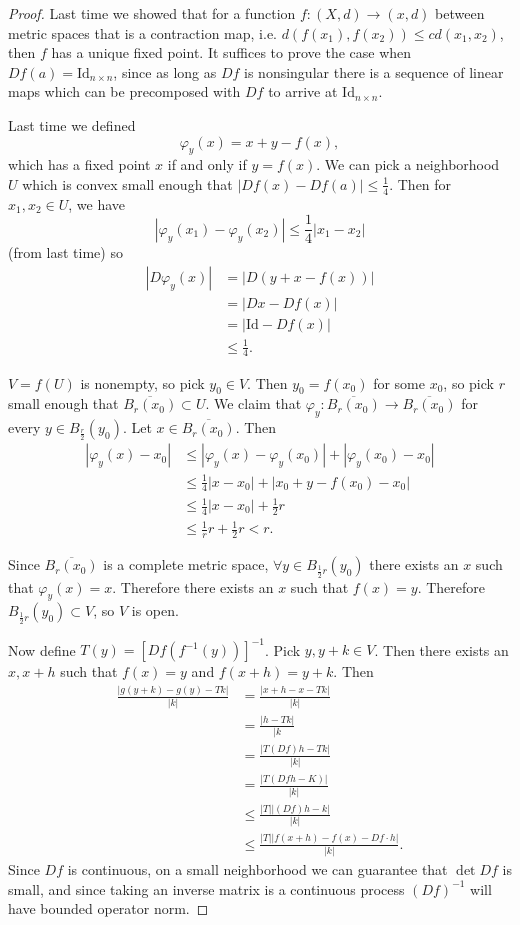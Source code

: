 \begin{proof}
Last time we showed that for a function
$f: (X, d) \to (x, d)$ between metric spaces that is a contraction
map, i.e. $d(f(x_1), f(x_2)) \leq c d(x_1, x_2)$, then $f$ has a unique
fixed point. It suffices to prove the case when
$Df(a) = \mathrm{Id}_{n  \times n}$, since as long as $D f$ is
nonsingular there is a sequence of linear maps which can be
precomposed with $D f$ to arrive at $\mathrm{Id}_{n \times n}$.

Last time we defined
$$
\varphi_y(x) = x + y - f(x),
$$
which has a fixed point $x$ if and only if $y = f(x)$. We can pick a
neighborhood $U$ which is convex small enough that
$|Df(x) - Df(a)| \leq \frac{1}{4}$. Then for $x_1, x_2 \in U$, we have
$$
|\varphi_y(x_1) - \varphi_y(x_2)| \leq \frac{1}{4}|x_1 - x_2|
$$
(from last time) so
\begin{align*}
      |D\varphi_y(x)|
&=    |D(y + x - f(x))| \\
&=    |D x - D f(x)| \\
&=    |\mathrm{Id} - Df(x)| \\
&\leq \frac{1}{4}.
\end{align*}

$V = f(U)$ is nonempty, so pick $y_0 \in V$.
Then $y_0 = f(x_0)$ for some $x_0$, so pick $r$ small enough that
$\overline{B_r(x_0)} \subset U$. We claim that
$\varphi_y : \overline{B_r(x_0)} \to \overline{B_r(x_0)}$ for every
$y \in B_{\frac{r}{2}}(y_0)$. Let $x \in \overline{B_r(x_0)}$.
Then
\begin{align*}
      |\varphi_y(x) - x_0|
&\leq |\varphi_y(x) - \varphi_y(x_0)|
    + |\varphi_y(x_0) - x_0| \\
&\leq \frac{1}{4}|x - x_0|
    + |x_0 + y - f(x_0) - x_0| \\
&\leq \frac{1}{4}|x - x_0|
    + \frac{1}{2}r \\
&\leq \frac{1}{r}r + \frac{1}{2}r
    < r.
\end{align*}

Since $\overline{B_r(x_0)}$ is a complete metric space,
$\forall y \in B_{\frac{1}{2}r}(y_0)$ there exists an $x$ such that
$\varphi_y(x) = x$. Therefore there exists an $x$ such that $f(x) =
y$. Therefore $B_{\frac{1}{2}r}(y_0) \subset V$, so $V$ is open.

Now define $T(y) = [Df(f^{-1}(y))]^{-1}$. Pick $y, y + k \in V$. Then
there exists an $x, x + h$ such that $f(x) = y$ and $f(x + h) = y +
k$. Then
\begin{align*}
      \frac{|g(y + k) - g(y) - T k|}{|k|}
&=    \frac{|x + h - x - T k|}
           {|k|} \\
&=    \frac{|h - Tk|}
           {|k} \\
&=    \frac{|T (Df) h  - Tk|}
           {|k|} \\
&=    \frac{|T(Df h - K)|}
           {|k|} \\
&\leq \frac{|T||(Df)h - k|}
           {|k|} \\
&\leq \frac{|T||f(x + h) - f(x) - Df \cdot h|}
           {|k|}.
\end{align*}
Since $Df$ is continuous, on a small neighborhood we can guarantee
that $\det Df$ is small, and since taking an inverse matrix is a
continuous process $(Df)^{-1}$ will have bounded operator norm.


\end{proof}
